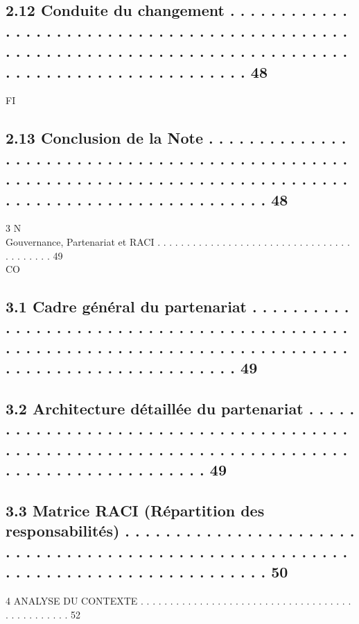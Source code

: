 \subsection{2.12    Conduite du changement . . . . . . . . . . . . . . . . . . . . . . . . . . . . . . . . . . . . . . . . . . . . . . . . . . . . . . . . . . . . . . . . . . . . . . . . . . . . . . . . . . . . . . . . . . . . . . . . . . . . . . . . 48}
\vspace{0.5em}
\vspace{0.5em}
\vspace{0.5em}
\vspace{0.5em}
FI\\
\subsection{2.13    Conclusion de la Note . . . . . . . . . . . . . . . . . . . . . . . . . . . . . . . . . . . . . . . . . . . . . . . . . . . . . . . . . . . . . . . . . . . . . . . . . . . . . . . . . . . . . . . . . . . . . . . . . . . . . . . . . . . . 48}
\vspace{0.5em}
3                                                                                  N\\
Gouvernance, Partenariat et RACI . . . . . . . . . . . . . . . . . . . . . . . . . . . . . . . . . . . . . . . . . 49\\
CO\\
\subsection{3.1     Cadre général du partenariat . . . . . . . . . . . . . . . . . . . . . . . . . . . . . . . . . . . . . . . . . . . . . . . . . . . . . . . . . . . . . . . . . . . . . . . . . . . . . . . . . . . . . . . . . . . . . . . . . . . . . 49}
\subsection{3.2     Architecture détaillée du partenariat . . . . . . . . . . . . . . . . . . . . . . . . . . . . . . . . . . . . . . . . . . . . . . . . . . . . . . . . . . . . . . . . . . . . . . . . . . . . . . . . . . . . . . . . . . . . . 49}
\subsection{3.3     Matrice RACI (Répartition des responsabilités) . . . . . . . . . . . . . . . . . . . . . . . . . . . . . . . . . . . . . . . . . . . . . . . . . . . . . . . . . . . . . . . . . . . . . . . . . . . . . . . . . . . 50}
\vspace{0.5em}
4     ANALYSE DU CONTEXTE . . . . . . . . . . . . . . . . . . . . . . . . . . . . . . . . . . . . . . . . . . . . . . . 52\\
